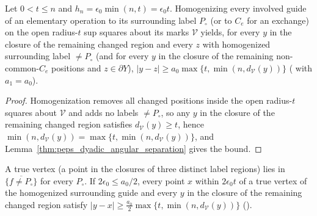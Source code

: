 \begin{lemma}
    \label{lem:peps_dyadic_floor}
    \leanok
    Let $0<t\le n$ and $h_n=\epsilon_0\min(n,t)=\epsilon_0t$. Homogenizing every
    involved guide of an elementary operation to its surrounding label $P_\circ$
    (or to $C_e$ for an exchange) on the open radius-$t$ sup squares about its
    marks $\mathcal V$ yields, for every $y$ in the closure of the remaining
    changed region and every $z$ with homogenized surrounding label $\ne P_\circ$
    (and for every $y$ in the closure of the remaining non-common-$C_e$ positions
    and $z\in\partial Y$),
    $|y-z|\ge a_0\max\{t,\min(n,d_{\mathcal V}(y))\}$
    (\cite[Section~7, lines 357--367]{OpenAI2026PolynomialPEPS} with $a_1=a_0$).
\end{lemma}

\begin{proof}\leanok
    Homogenization removes all changed positions inside the open radius-$t$ squares
    about $\mathcal V$ and adds no labels $\ne P_\circ$, so any $y$ in the closure
    of the remaining changed region satisfies $d_{\mathcal V}(y)\ge t$, hence
    $\min(n,d_{\mathcal V}(y))=\max\{t,\min(n,d_{\mathcal V}(y))\}$, and
    Lemma~\ref{thm:peps_dyadic_angular_separation} gives the bound.
\end{proof}

\begin{lemma}
    \label{lem:peps_dyadic_birth_enlargement}
    \leanok
    A true vertex (a point in the closures of three distinct label regions) lies in
    $\overline{\{f\ne P_\circ\}}$ for every $P_\circ$. If $2\epsilon_0\le a_0/2$,
    every point $x$ within $2\epsilon_0t$ of a true vertex of the homogenized
    surrounding guide and every $y$ in the closure of the remaining changed region
    satisfy $|y-x|\ge\tfrac{a_0}2\max\{t,\min(n,d_{\mathcal V}(y))\}$
    (\cite[Section~7, lines 368--373]{OpenAI2026PolynomialPEPS}).
\end{lemma}

